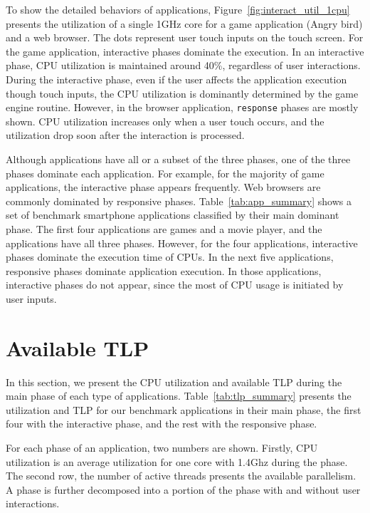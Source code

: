 To show the detailed behaviors of applications, Figure~\ref{fig:interact_util_1cpu} presents
the utilization of a single 1GHz core for a game application (Angry bird) and a web browser.
The dots represent user touch inputs on the touch screen.
For the game application, interactive phases dominate the execution.
In an interactive phase,
CPU utilization is maintained around 40\%, regardless of user interactions.
During the interactive phase, even if the user affects the application execution though
touch inputs, the CPU utilization is dominantly determined by the game engine routine.
However, in the browser application, {\tt response} phases are mostly
shown. CPU utilization increases only when a user touch occurs, and the utilization
drop soon after the interaction is processed.



Although applications have all or a subset of the three phases, one of the three phases
dominate each application. For example, for the majority of game applications, 
the interactive phase appears frequently. Web browsers are commonly dominated by
responsive phases. Table~\ref{tab:app_summary} shows a set of benchmark smartphone 
applications classified by their main dominant phase.
The first four applications are games and a movie player, and the applications
have all three phases. However, for the four applications, interactive phases
dominate the execution time of CPUs.
In the next five applications, responsive phases dominate application execution. In those applications,
interactive phases do not appear, since the most of CPU usage is initiated by user inputs.



\section {Available TLP}

In this section, we present the CPU utilization and available TLP during the main phase
of each type of applications. 
Table~\ref{tab:tlp_summary} presents the utilization and TLP for our benchmark applications in
their main phase, the first four with the interactive phase, and the rest with
the responsive phase.

For each phase of an application, two numbers are shown. Firstly,
CPU utilization is an average utilization for one core with 1.4Ghz during the phase. 
The second row, the number of
active threads presents the available parallelism. 
A phase is further decomposed into a portion of the phase with and without
user interactions. 

